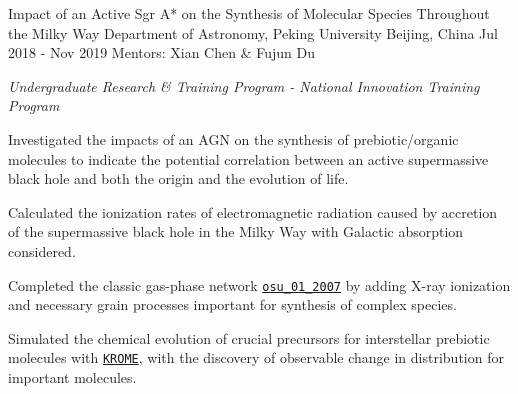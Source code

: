 


\begin{cvexperiences}


\cvexperience
{Impact of an Active Sgr A* on the Synthesis of Molecular Species Throughout the Milky Way} %
{Department of Astronomy, Peking University} %
{Beijing, China} %
{Jul 2018 - Nov 2019} %
{Mentors: Xian Chen \& Fujun Du}
{ %
\begin{cvitems}
\item {\textit{Undergraduate Research \& Training Program - National Innovation Training Program}}
\item {Investigated the impacts of an AGN on the synthesis of prebiotic/organic molecules to indicate the potential correlation between an active supermassive black hole and both the origin and the evolution of life.}
\item {Calculated the ionization rates of electromagnetic radiation caused by accretion of the supermassive black hole in the Milky Way with Galactic absorption considered.}
\item {Completed the classic gas-phase network \href{http://faculty.virginia.edu/ericherb/research_files/osu_01_2007}{\texttt{osu\_01\_2007}} by adding  X-ray ionization and necessary grain processes important for synthesis of complex species.}
\item {Simulated the chemical evolution of crucial precursors for interstellar prebiotic molecules with \href{http://kromepackage.org}{\texttt{KROME}}, with the discovery of observable change in distribution for important molecules.}
\end{cvitems}
}


\end{cvexperiences}
